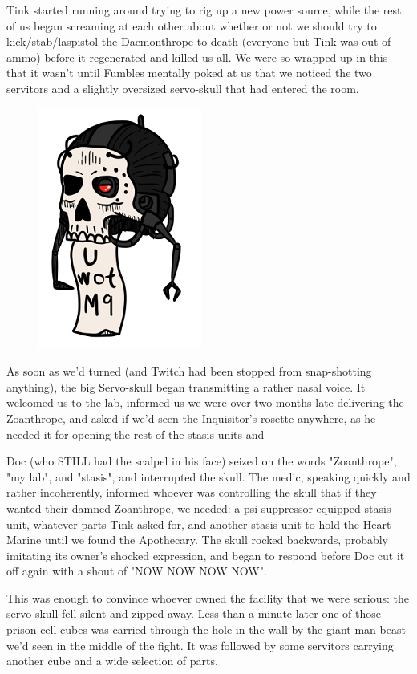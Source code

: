 Tink started running around trying to rig up a new power source, while the rest of us began screaming at each other about whether or not we should try to kick/stab/laspistol the Daemonthrope to death (everyone but Tink was out of ammo) before it regenerated and killed us all. 
We were so wrapped up in this that it wasn't until Fumbles mentally poked at us that we noticed the two servitors and a slightly oversized servo-skull that had entered the room.

\begin{figure}
	\begin{center}
		\includegraphics[width=\figwidth]{pics/16/60.png}
	\end{center}
\end{figure}
As soon as we'd turned (and Twitch had been stopped from snap-shotting anything), the big Servo-skull began transmitting a rather nasal voice. 
It welcomed us to the lab, informed us we were over two months late delivering the Zoanthrope, and asked if we'd seen the Inquisitor's rosette anywhere, as he needed it for opening the rest of the stasis units and-

Doc (who STILL had the scalpel in his face) seized on the words "Zoanthrope", "my lab", and "stasis", and interrupted the skull. 
The medic, speaking quickly and rather incoherently, informed whoever was controlling the skull that if they wanted their damned Zoanthrope, we needed: 
a psi-suppressor equipped stasis unit, whatever parts Tink asked for, and another stasis unit to hold the Heart-Marine until we found the Apothecary. 
The skull rocked backwards, probably imitating its owner's shocked expression, and began to respond before Doc cut it off again with a shout of "NOW NOW NOW NOW".

This was enough to convince whoever owned the facility that we were serious: 
the servo-skull fell silent and zipped away. 
Less than a minute later one of those prison-cell cubes was carried through the hole in the wall by the giant man-beast we'd seen in the middle of the fight. 
It was followed by some servitors carrying another cube and a wide selection of parts.

